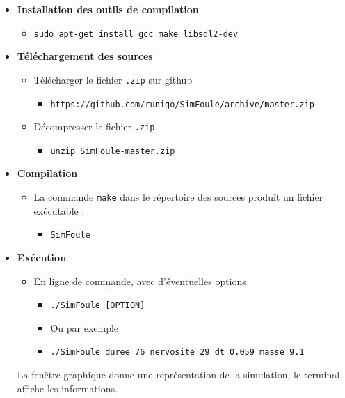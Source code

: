 \begin{itemize}[leftmargin=1cm, label=, itemsep=0pt]%
\item {\bf Installation des outils de compilation}
	\begin{itemize}[leftmargin=1cm, label=, itemsep=0pt]
	\item \texttt{sudo apt-get install gcc make libsdl2-dev}
	\end{itemize}
\item {\bf Téléchargement des sources}
	\begin{itemize}[leftmargin=1cm, label=, itemsep=0pt]
	\item Télécharger le fichier \texttt{.zip} sur github
		\begin{itemize}[leftmargin=1cm, label=, itemsep=0pt]
		\item \texttt{https://github.com/runigo/SimFoule/archive/master.zip}
		\end{itemize}
	\item Décompresser le fichier \texttt{.zip}
		\begin{itemize}[leftmargin=1cm, label=, itemsep=0pt]
		\item \texttt{unzip SimFoule-master.zip}
		\end{itemize}
	\end{itemize}
\item {\bf Compilation}
	\begin{itemize}[leftmargin=1cm, label=, itemsep=0pt]
	\item La commande \texttt{make} dans le répertoire des sources produit un fichier exécutable :
		\begin{itemize}[leftmargin=1cm, label=, itemsep=0pt]
		\item \texttt{SimFoule}
		\end{itemize}
	\end{itemize}

\item {\bf Exécution}
	\begin{itemize}[leftmargin=1cm, label=, itemsep=0pt]
	\item En ligne de commande, avec d'éventuelles options
		\begin{itemize}[leftmargin=1cm, label=, itemsep=0pt]
		\item \texttt{./SimFoule [OPTION]}
		\item Ou par exemple
		\item \texttt{./SimFoule duree 76 nervosite 29 dt 0.059 masse 9.1}
		\end{itemize}
	\end{itemize}



La fenêtre graphique donne une représentation de la simulation, le terminal affiche les informations.
\end{itemize}




